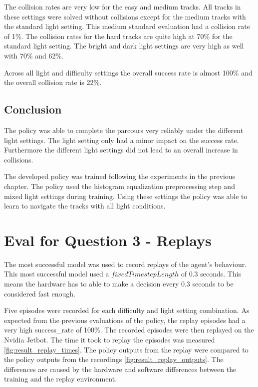 The collision rates are very low for the easy and medium tracks. All tracks in these settings were solved without collisions except for the medium tracks with the standard light setting. This medium standard evaluation had a collision rate of 1\%.
The collision rates for the hard tracks are quite high at 70\% for the standard light setting. The bright and dark light settings are very high as well with 70\% and 62\%.

Across all light and difficulty settings the overall success rate is almost 100\% and the overall collision rate is 22\%.

\subsection{Conclusion}

The policy was able to complete the parcours very reliably under the different light settings. The light setting only had a minor impact on the success rate.
Furthermore the different light settings did not lead to an overall increase in collisions.

The developed policy was trained following the experiments in the previous chapter. The policy used the histogram equalization preprocessing step and mixed light settings during training. Using these settings the policy was able to learn to navigate the tracks with all light conditions.


\section{Eval for Question 3 - Replays}

The most successful model was used to record replays of the agent's behaviour. This most successful model used a $fixedTimestepLength$ of $0.3$ seconds. This means the hardware has to able to make a decision every $0.3$ seconds to be considered fast enough.

Five episodes were recorded for each difficulty and light setting combination. As expected from the previous evaluations of the policy, the replay episodes had a very high success\_rate of 100\%. The recorded episodes were then replayed on the Nvidia Jetbot. The time it took to replay the episodes was measured \ref{fig:result_replay_times}. The policy outputs from the replay were compared to the policy outputs from the recordings \ref{fig:result_replay_outputs}. The differences are caused by the hardware and software differences between the training and the replay environment.


